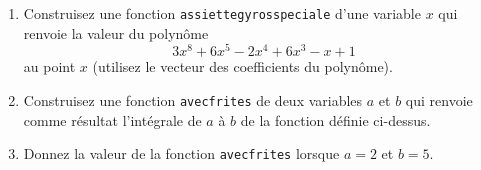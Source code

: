 \begin{exercice}\label{exoMatlab0022}

\begin{enumerate}
\item Construisez une fonction \texttt{assiettegyrosspeciale} d'une variable $x$ qui renvoie la valeur du polynôme
\[ 3x^8 + 6x^5 - 2x^4 + 6x^3 - x + 1 \]
au point $x$ (utilisez le vecteur des coefficients du polynôme).
\item Construisez une fonction \texttt{avecfrites} de deux variables $a$ et $b$ qui renvoie comme résultat l'intégrale de $a$ à $b$ de la fonction définie ci-dessus.
\item Donnez la valeur de la fonction \texttt{avecfrites} lorsque $a=2$ et $b=5$.
\end{enumerate}

\end{exercice}

